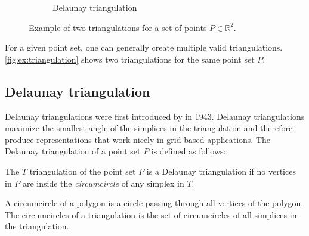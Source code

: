 \begin{figure}[ht]
\begin{subfigure}[b]{0.4\textwidth}
        \caption{Delaunay triangulation}
        \label{fig:triangulation-delaunay}
    \end{subfigure}
    \caption[Example of triangulation]{Example of two triangulations for a set of points $P \in \mathbb{R}^2$.}
    \label{fig:ex:triangulation}
\end{figure}

For a given point set, one can generally create multiple valid triangulations. \autoref{fig:ex:triangulation} shows two triangulations for the same point set $P$.


\subsection{Delaunay triangulation}
Delaunay triangulations were first introduced by \textcite{delaunay_1943} in 1943. Delaunay triangulations maximize the smallest angle of the simplices in the triangulation and therefore produce representations that work nicely in grid-based applications. The Delaunay triangulation of a point set $P$ is defined as follows:
\begin{definition}
\label{def:delaunay}
The $T$ triangulation of the point set $P$ is a Delaunay triangulation if no vertices in $P$ are inside the \emph{circumcircle} of any simplex in $T$.
\end{definition}

\begin{definition}[Circumcircle]
A circumcircle of a polygon is a circle passing through all vertices of the polygon. The circumcircles of a triangulation is the set of circumcircles of all simplices in the triangulation.
\end{definition}

